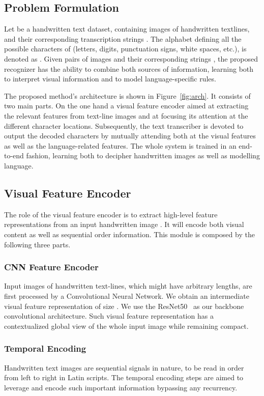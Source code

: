 \documentclass[10pt,twocolumn,letterpaper]{article}
\begin{document}
\subsection{Problem Formulation}
Let  be a handwritten text dataset, containing images  of handwritten textlines, and their corresponding transcription strings . The alphabet defining all the possible characters of  (letters, digits, punctuation signs, white spaces, etc.), is denoted as . Given pairs of images  and their corresponding strings , the proposed recognizer has the ability to combine both sources of information, learning both to interpret visual information and to model language-specific rules. 

The proposed method's architecture is shown in Figure~\ref{fig:arch}. It consists of two main parts. On the one hand a visual feature encoder aimed at extracting the relevant features from text-line images and at focusing its attention at the different character locations. Subsequently, the text transcriber is devoted to output the decoded characters by mutually attending both at the visual features as well as the language-related features. The whole system is trained in an end-to-end fashion, learning both to decipher handwritten images as well as modelling language. 





\subsection{Visual Feature Encoder}
The role of the visual feature encoder is to extract high-level feature representations from an input handwritten image . It will encode both visual content as well as sequential order information. This module is composed by the following three parts.

\subsubsection{CNN Feature Encoder}
\label{sec:cnn}
Input images  of handwritten text-lines, which might have arbitrary lengths, are first processed by a Convolutional Neural Network. We obtain an intermediate visual feature representation  of size .  We use the ResNet50~\cite{he2016deep} as our backbone convolutional architecture. Such visual feature representation has a contextualized global view of the whole input image while remaining compact.

\subsubsection{Temporal Encoding}
\label{sec:te}
Handwritten text images are sequential signals in nature, to be read in order from left to right in Latin scripts. The temporal encoding steps are aimed to leverage and encode such important information bypassing any recurrency. 
\end{document}
